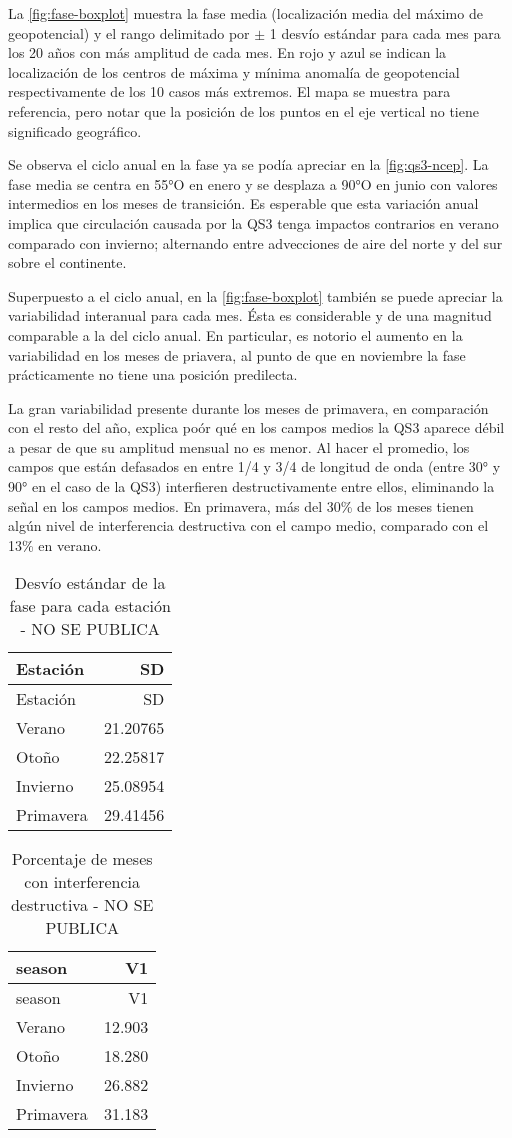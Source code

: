 \documentclass[spanish,a4paper]{book}
\begin{document}
La \autoref{fig:fase-boxplot} muestra la fase media (localización media
del máximo de geopotencial) y el rango delimitado por \(\pm\) 1 desvío
estándar para cada mes para los 20 años con más amplitud de cada mes. En
rojo y azul se indican la localización de los centros de máxima y mínima
anomalía de geopotencial respectivamente de los 10 casos más extremos.
El mapa se muestra para referencia, pero notar que la posición de los
puntos en el eje vertical no tiene significado geográfico.

Se observa el ciclo anual en la fase ya se podía apreciar en la
\autoref{fig:qs3-ncep}. La fase media se centra en 55°O en enero y se
desplaza a 90°O en junio con valores intermedios en los meses de
transición. Es esperable que esta variación anual implica que
circulación causada por la QS3 tenga impactos contrarios en verano
comparado con invierno; alternando entre advecciones de aire del norte y
del sur sobre el continente.

Superpuesto a el ciclo anual, en la \autoref{fig:fase-boxplot} también
se puede apreciar la variabilidad interanual para cada mes. Ésta es
considerable y de una magnitud comparable a la del ciclo anual. En
particular, es notorio el aumento en la variabilidad en los meses de
priavera, al punto de que en noviembre la fase prácticamente no tiene
una posición predilecta.

La gran variabilidad presente durante los meses de primavera, en
comparación con el resto del año, explica poór qué en los campos medios
la QS3 aparece débil a pesar de que su amplitud mensual no es menor. Al
hacer el promedio, los campos que están defasados en entre 1/4 y 3/4 de
longitud de onda (entre 30° y 90° en el caso de la QS3) interfieren
destructivamente entre ellos, eliminando la señal en los campos medios.
En primavera, más del 30\% de los meses tienen algún nivel de
interferencia destructiva con el campo medio, comparado con el 13\% en
verano.

\begin{longtable}[]{@{}lr@{}}
\caption{Desvío estándar de la fase para cada estación - NO SE
PUBLICA}\tabularnewline
\toprule
Estación & SD\tabularnewline
\midrule
\endfirsthead
\toprule
Estación & SD\tabularnewline
\midrule
\endhead
Verano & 21.20765\tabularnewline
Otoño & 22.25817\tabularnewline
Invierno & 25.08954\tabularnewline
Primavera & 29.41456\tabularnewline
\bottomrule
\end{longtable}

\begin{longtable}[]{@{}lr@{}}
\caption{Porcentaje de meses con interferencia destructiva - NO SE
PUBLICA}\tabularnewline
\toprule
season & V1\tabularnewline
\midrule
\endfirsthead
\toprule
season & V1\tabularnewline
\midrule
\endhead
Verano & 12.903\tabularnewline
Otoño & 18.280\tabularnewline
Invierno & 26.882\tabularnewline
Primavera & 31.183\tabularnewline
\bottomrule
\end{longtable}
\end{document}
